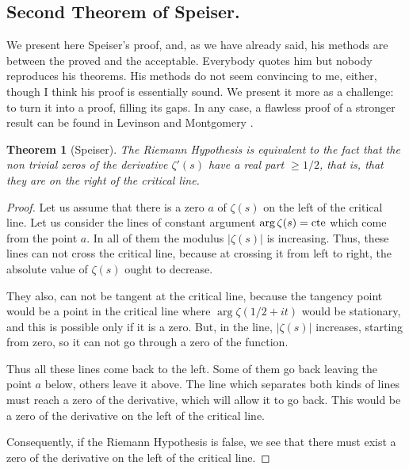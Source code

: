 \documentclass[a4paper]{amsart}
\newtheorem{Teorema}{Theorem}
\numberwithin{equation}{section}
\begin{document}
\begin{large}

    
\section{Second Theorem of  Speiser.}

We present here Speiser's proof, and, as we have already said, his methods are
between the proved and the acceptable. Everybody quotes him but nobody
reproduces his theorems. His methods do not seem convincing to me, either, 
though I think his proof is essentially sound. We present it more as a challenge: to turn
it into a proof, filling its gaps. In any case, a flawless proof of a stronger
result can be found in Levinson and Montgomery \cite{LM}.





\begin{Teorema}[Speiser]
    The Riemann Hypothesis is equivalent to the fact
that the non trivial zeros of the derivative $\zeta'(s)$ have a real part $\ge
1/2$, that is, that they are on the right of the critical line.
\end{Teorema}

\begin{proof}[Proof]
    Let us assume that there is a zero $a$ of $\zeta(s)$ on the left
of the critical line. Let us consider the lines of constant argument
$\arg\zeta(s)=\hbox{cte}$ which come from the point $a$. In all of them the modulus
$|\zeta(s)|$ is increasing. Thus, these lines can not cross the
critical line, because at crossing it from left to right, the absolute value of
$\zeta(s)$ ought to decrease.

They also, can not be tangent at the critical line, because the tangency point
would be a point in the critical line where $\arg\zeta(1/2 + it)$ would be
stationary, and this is possible only if it is a zero. But, in the line,
$|\zeta(s)|$ increases, starting from zero, so it can not go through a
zero of the function.

Thus all these lines come back to the left. Some of them go back leaving the
point $a$ below, others leave it above. The line which separates both kinds of
lines must reach a zero of the derivative, which will allow it to go back.
This would be a zero of the derivative on the left of the critical line.

Consequently, if the Riemann Hypothesis is false, we see that there must exist
a zero of the derivative on the left of the critical line.
\medskip


\end{proof}
\end{large}
\end{document}
